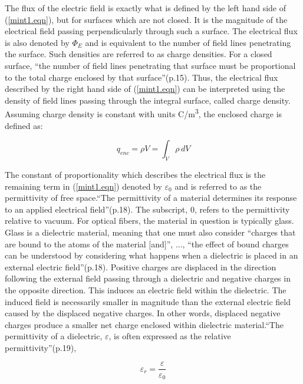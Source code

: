 \documentclass[12pt]{article}
\theoremstyle{definition}
\numberwithin{equation}{section}
\begin{document}
The flux of the electric field is exactly what is defined by the left hand side of (\ref{mint1.eqn}), but for surfaces which are not closed. It is the magnitude of the electrical field passing perpendicularly through such a surface. The electrical flux is also denoted by $\Phi_{E}$ and is equivalent to the number of field lines penetrating the surface. Such densities are referred to as charge densities. For a closed surface, \enquote{the number of field lines penetrating that surface must be proportional to the total charge enclosed by that surface}(p.15)\cite{Flei}. Thus, the electrical flux described by the right hand side of (\ref{mint1.eqn}) can be interpreted using the density of field lines passing through the integral surface, called charge density. Assuming charge density is constant with units \si{C/m^3}, the enclosed charge is defined as:

\begin{equation}
q_{enc}=\rho V=\int_{V}\rho\,dV
\end{equation}

The constant of proportionality which describes the electrical flux is the remaining term in (\ref{mint1.eqn}) denoted by $\varepsilon_{0}$ and is referred to as the permittivity of free space.\enquote{The permittivity of a material determines its response to an applied electrical field}(p.18)\cite{Flei}. The subscript, $0$, refers to the permittivity relative to vacuum. For optical fibers, the material in question is typically glass.
Glass is a dielectric material, meaning that one must also consider \enquote{charges that are bound to the atoms of the material [and]}, ..., \enquote{the effect of bound charges can be understood by considering what happens when a dielectric is placed in an external electric field}(p.18)\cite{Flei}. Positive charges are displaced in the direction following the external field passing through a dielectric and negative charges in the opposite direction. This induces an electric field within the dielectric. The induced field is necessarily smaller in magnitude than the external electric field caused by the displaced negative charges. In other words, displaced negative charges produce a smaller net charge enclosed within dielectric material.\enquote{The permittivity of a dielectric, $\varepsilon$, is often expressed as the relative permittivity}(p.19)\cite{Flei},

\begin{equation}
\varepsilon_{r}=\frac{\varepsilon}{\varepsilon_{0}}
\label{relperm.eqn}
\end{equation}
\end{document}
